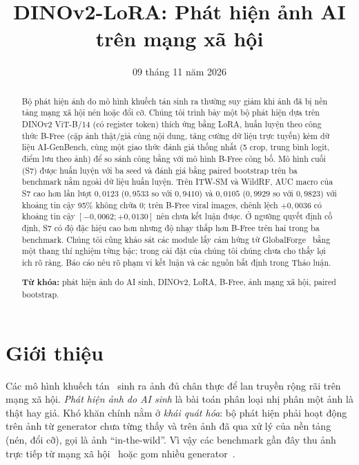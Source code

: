 \documentclass[11pt,a4paper]{article}
\title{\textbf{DINOv2-LoRA: Phát hiện ảnh AI trên mạng xã hội}}
\author{}
\date{09 tháng 11 năm 2026}
\begin{document}
\maketitle

\begin{abstract}
\noindent Bộ phát hiện ảnh do mô hình khuếch tán sinh ra thường suy giảm khi ảnh đã bị nền tảng mạng xã hội nén hoặc đổi cỡ. Chúng tôi trình bày một bộ phát hiện dựa trên DINOv2 ViT-B/14 (có register token) thích ứng bằng LoRA, huấn luyện theo công thức B-Free (cặp ảnh thật/giả cùng nội dung, tăng cường dữ liệu trực tuyến) kèm dữ liệu AI-GenBench, cùng một giao thức đánh giá thống nhất (5 crop, trung bình logit, điểm lưu theo ảnh) để so sánh công bằng với mô hình B-Free công bố. Mô hình cuối (S7) được huấn luyện với ba seed và đánh giá bằng paired bootstrap trên ba benchmark nằm ngoài dữ liệu huấn luyện. Trên ITW-SM và WildRF, AUC macro của S7 cao hơn lần lượt $0{,}0123$ ($0{,}9533$ so với $0{,}9410$) và $0{,}0105$ ($0{,}9929$ so với $0{,}9823$) với khoảng tin cậy 95\% không chứa $0$; trên B-Free viral images, chênh lệch $+0{,}0036$ có khoảng tin cậy $[-0{,}0062;+0{,}0130]$ nên chưa kết luận được. Ở ngưỡng quyết định cố định, S7 có độ đặc hiệu cao hơn nhưng độ nhạy thấp hơn B-Free trên hai trong ba benchmark. Chúng tôi cũng khảo sát các module lấy cảm hứng từ GlobalForge~\cite{cui2026globalforge} bằng một thang thí nghiệm từng bậc; trong cài đặt của chúng tôi chúng chưa cho thấy lợi ích rõ ràng. Báo cáo nêu rõ phạm vi kết luận và các nguồn bất định trong Thảo luận.

\medskip\noindent\textbf{Từ khóa:} phát hiện ảnh do AI sinh, DINOv2, LoRA, B-Free, ảnh mạng xã hội, paired bootstrap.
\end{abstract}

\tableofcontents
\newpage

\section{Giới thiệu}
Các mô hình khuếch tán~\cite{rombach2022highresolution} sinh ra ảnh đủ chân thực để lan truyền rộng rãi trên mạng xã hội. \emph{Phát hiện ảnh do AI sinh} là bài toán phân loại nhị phân một ảnh là thật hay giả. Khó khăn chính nằm ở \emph{khái quát hóa}: bộ phát hiện phải hoạt động trên ảnh từ generator chưa từng thấy và trên ảnh đã qua xử lý của nền tảng (nén, đổi cỡ), gọi là ảnh ``in-the-wild''. Vì vậy các benchmark gần đây thu ảnh trực tiếp từ mạng xã hội~\cite{cavia2024realtime,konstantinidou2026navigating,guillaro2025bfree} hoặc gom nhiều generator~\cite{pellegrini2025aigenbench}.
\end{document}
